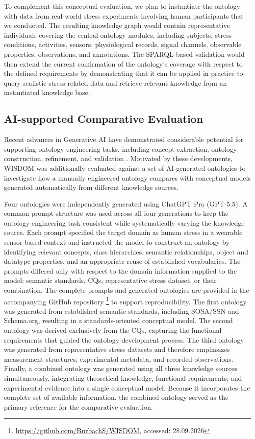 \documentclass[
]{ceurart}
\begin{document}
To complement this conceptual evaluation, we plan to instantiate the ontology with data from real-world stress experiments involving human participants \cite{Schreiber2025} that we conducted. The resulting knowledge graph would contain representative individuals covering the central ontology modules, including subjects, stress conditions, activities, sensors, physiological records, signal channels, observable properties, observations, and annotations. The SPARQL-based validation would then extend the current confirmation of the ontology’s coverage with respect to the defined requirements by demonstrating that it can be applied in practice to query realistic stress-related data and retrieve relevant knowledge from an instantiated knowledge base.


\subsection{AI-supported Comparative Evaluation}
Recent advances in Generative AI have demonstrated considerable potential for supporting ontology engineering tasks, including concept extraction, ontology construction, refinement, and validation \cite{Shimizu2025, Li2025}. Motivated by these developments, WISDOM was additionally evaluated against a set of AI-generated ontologies to investigate how a manually engineered ontology compares with conceptual models generated automatically from different knowledge sources.

Four ontologies were independently generated using ChatGPT Pro (GPT-5.5). A common prompt structure was used across all four generations to keep the ontology-engineering task consistent while systematically varying the knowledge source. Each prompt specified the target domain as human stress in a wearable sensor-based context and instructed the model to construct an ontology by identifying relevant concepts, class hierarchies, semantic relationships, object and datatype properties, and an appropriate reuse of established vocabularies. The prompts differed only with respect to the domain information supplied to the model: semantic standards, CQs, representative stress dataset, or their combination. The complete prompts and generated ontologies are provided in the accompanying GitHub repository \footnote{\url{https://github.com/BurbachS/WISDOM}, accessed: 28.09.2026} to support reproducibility.
The first ontology was generated from established semantic standards, including SOSA/SSN and Schema.org, resulting in a standards-oriented conceptual model. The second ontology was derived exclusively from the CQs, capturing the functional requirements that guided the ontology development process. The third ontology was generated from representative stress datasets \cite{Schreiber2025} and therefore emphasizes measurement structures, experimental metadata, and recorded observations. Finally, a combined ontology was generated using all three knowledge sources simultaneously, integrating theoretical knowledge, functional requirements, and experimental evidence into a single conceptual model. Because it incorporates the complete set of available information, the combined ontology served as the primary reference for the comparative evaluation.
\end{document}

